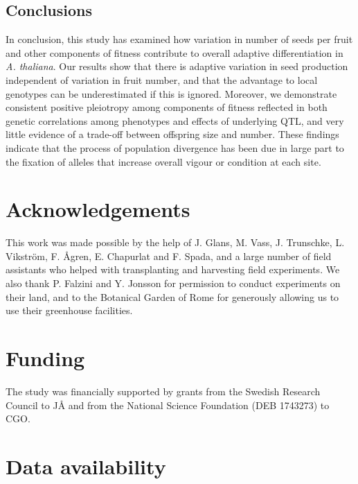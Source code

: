 \documentclass[]{article}
\begin{document}
\hypertarget{conclusions}{%
\subsection{Conclusions}\label{conclusions}}

In conclusion, this study has examined how variation in number of seeds per fruit and other components of fitness contribute to overall adaptive differentiation in \emph{A. thaliana}. Our results show that there is adaptive variation in seed production independent of variation in fruit number, and that the advantage to local genotypes can be underestimated if this is ignored. Moreover, we demonstrate consistent positive pleiotropy among components of fitness reflected in both genetic correlations among phenotypes and effects of underlying QTL, and very little evidence of a trade-off between offspring size and number. These findings indicate that the process of population divergence has been due in large part to the fixation of alleles that increase overall vigour or condition at each site.

\hypertarget{acknowledgements}{%
\section{Acknowledgements}\label{acknowledgements}}

This work was made possible by the help of J. Glans, M. Vass, J. Trunschke, L. Vikström, F. Ågren, E. Chapurlat and F. Spada, and a large number of field assistants who helped with transplanting and harvesting field experiments. We also thank P. Falzini and Y. Jonsson for permission to conduct experiments on their land, and to the Botanical Garden of Rome for generously allowing us to use their greenhouse facilities.

\hypertarget{funding}{%
\section{Funding}\label{funding}}

The study was financially supported by grants from the Swedish Research Council to JÅ and from the National Science Foundation (DEB 1743273) to CGO.

\hypertarget{data-availability}{%
\section{Data availability}\label{data-availability}}
\end{document}
